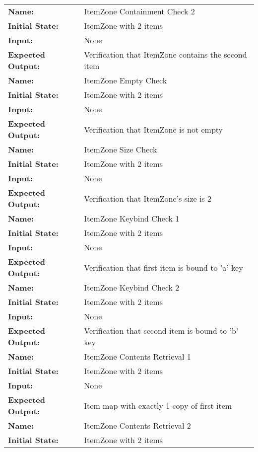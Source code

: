 \documentclass[12pt, titlepage]{article}
\begin{document}
\begin{center}
\begin{longtable}{ l | p{10cm} }
				\hline
				\rule{0pt}{2em}\textbf{Name:} & ItemZone Containment Check 2\\
				\textbf{Initial State:} & ItemZone with 2 items\\
				\textbf{Input:} & None\\
				\textbf{Expected Output:} & Verification that ItemZone contains the second item\\[1em]
				\hline
				\rule{0pt}{2em}\textbf{Name:} & ItemZone Empty Check\\
				\textbf{Initial State:} & ItemZone with 2 items\\
				\textbf{Input:} & None\\
				\textbf{Expected Output:} & Verification that ItemZone is not empty\\[1em]
				\hline
				\rule{0pt}{2em}\textbf{Name:} & ItemZone Size Check\\
				\textbf{Initial State:} & ItemZone with 2 items\\
				\textbf{Input:} & None\\
				\textbf{Expected Output:} & Verification that ItemZone's size is 2\\[1em]
				\hline
				\rule{0pt}{2em}\textbf{Name:} & ItemZone Keybind Check 1\\
				\textbf{Initial State:} & ItemZone with 2 items\\
				\textbf{Input:} & None\\
				\textbf{Expected Output:} & Verification that first item is bound to 'a' key\\[1em]
				\hline
				\rule{0pt}{2em}\textbf{Name:} & ItemZone Keybind Check 2\\
				\textbf{Initial State:} & ItemZone with 2 items\\
				\textbf{Input:} & None\\
				\textbf{Expected Output:} & Verification that second item is bound to 'b' key\\[1em]
				\hline
				\rule{0pt}{2em}\textbf{Name:} & ItemZone Contents Retrieval 1\\
				\textbf{Initial State:} & ItemZone with 2 items\\
				\textbf{Input:} & None\\
				\textbf{Expected Output:} & Item map with exactly 1 copy of first item\\[1em]
				\hline
				\rule{0pt}{2em}\textbf{Name:} & ItemZone Contents Retrieval 2\\
				\textbf{Initial State:} & ItemZone with 2 items\\

\end{longtable}
\end{center}
\end{document}
